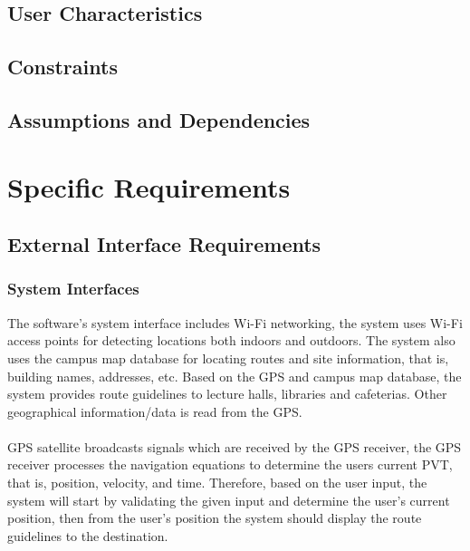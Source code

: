 \documentclass[12pt, a4paper]{article}
\begin{document}
	\subsection{User Characteristics}
	\subsection{Constraints}
	\subsection{Assumptions and Dependencies}

\section{Specific Requirements}
	\subsection{External Interface Requirements}
		\subsubsection{System Interfaces}
The software’s system interface includes Wi-Fi networking, the system uses Wi-Fi access points for detecting locations both indoors and outdoors. 
The system also uses the campus map database for locating routes and site information, that is, building names, addresses, etc. 
Based on the GPS and campus map database, the system provides route guidelines to lecture halls, libraries and cafeterias. 
Other geographical information/data is read from the GPS.\\\\
GPS satellite broadcasts signals which are received by the GPS receiver, the GPS receiver processes the navigation equations 
to determine the users current PVT, that is, position, velocity, and time. Therefore, based on the user input, the system will start by validating 
the given input and determine the user’s current position, then from the user’s position the system should display the route guidelines to the destination.\\
\end{document}

